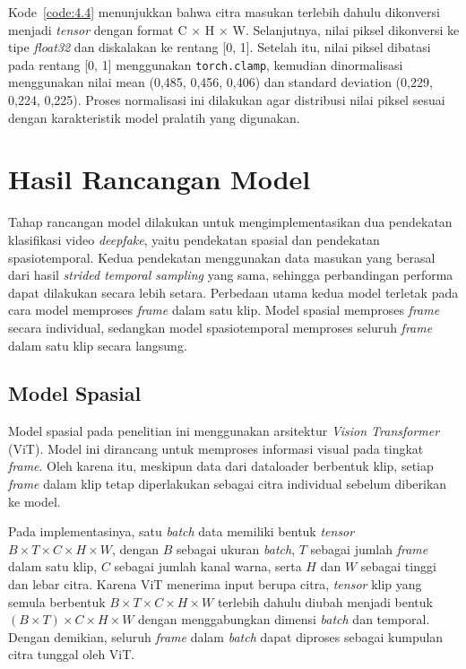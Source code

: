 Kode~\ref{code:4.4} menunjukkan bahwa citra masukan terlebih dahulu dikonversi menjadi \textit{tensor} dengan format C $\times$ H $\times$ W. Selanjutnya, nilai piksel dikonversi ke tipe \textit{float32} dan diskalakan ke rentang [0, 1]. Setelah itu, nilai piksel dibatasi pada rentang [0, 1] menggunakan \texttt{torch.clamp}, kemudian dinormalisasi menggunakan nilai mean (0,485, 0,456, 0,406) dan standard deviation (0,229, 0,224, 0,225). Proses normalisasi ini dilakukan agar distribusi nilai piksel sesuai dengan karakteristik model pralatih yang digunakan.

\section{Hasil Rancangan Model} \label{IV.Model}
Tahap rancangan model dilakukan untuk mengimplementasikan dua pendekatan klasifikasi video \textit{deepfake}, yaitu pendekatan spasial dan pendekatan spasiotemporal. Kedua pendekatan menggunakan data masukan yang berasal dari hasil \textit{strided temporal sampling} yang sama, sehingga perbandingan performa dapat dilakukan secara lebih setara. Perbedaan utama kedua model terletak pada cara model memproses \textit{frame} dalam satu klip. Model spasial memproses \textit{frame} secara individual, sedangkan model spasiotemporal memproses seluruh \textit{frame} dalam satu klip secara langsung.

\subsection{Model Spasial} \label{IV.Model_Spasial}
Model spasial pada penelitian ini menggunakan arsitektur \textit{Vision Transformer} (ViT). Model ini dirancang untuk memproses informasi visual pada tingkat \textit{frame}. Oleh karena itu, meskipun data dari dataloader berbentuk klip, setiap \textit{frame} dalam klip tetap diperlakukan sebagai citra individual sebelum diberikan ke model.

Pada implementasinya, satu \textit{batch} data memiliki bentuk \textit{tensor} $B \times T \times C \times H \times W$, dengan $B$ sebagai ukuran \textit{batch}, $T$ sebagai jumlah \textit{frame} dalam satu klip, $C$ sebagai jumlah kanal warna, serta $H$ dan $W$ sebagai tinggi dan lebar citra. Karena ViT menerima input berupa citra, \textit{tensor} klip yang semula berbentuk $B \times T \times C \times H \times W$ terlebih dahulu diubah menjadi bentuk $(B \times T) \times C \times H \times W$ dengan menggabungkan dimensi \textit{batch} dan temporal. Dengan demikian, seluruh \textit{frame} dalam \textit{batch} dapat diproses sebagai kumpulan citra tunggal oleh ViT.

